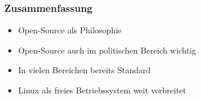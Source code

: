 \begin{frame}
	\frametitle{Zusammenfassung}
	\begin{itemize}
		\item Open-Source als Philosophie
		\item Open-Source auch im politischen Bereich wichtig
		\item In vielen Bereichen bereits Standard
		\item Linux als freies Betriebssystem weit verbreitet
	\end{itemize}
\end{frame}

 






 






